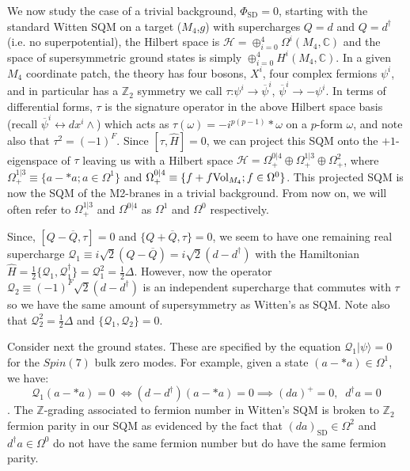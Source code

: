 \documentclass[12pt]{article}%
\numberwithin{equation}{section}
\renewcommand{\(}{\left(}
\renewcommand{\)}{\right)}
\renewcommand{\[}{\left[}
\renewcommand{\]}{\right]}
\begin{document}
 We now study the case of a trivial background, $\Phi_{\mathrm{SD}}=0$, starting with the standard Witten SQM on a target ($M_4$,$g$) with supercharges $Q=d$ and $Q=d^\dagger$ (i.e. no superpotential)\cite{10.4310/jdg/1214437492}, the Hilbert space is $\mathcal{H}=\oplus^{4}_{i=0}\Omega^i(M_4,\mathbb{C})$ and the space of supersymmetric ground states is simply $\oplus^{4}_{i=0}H^i(M_4,\mathbb{C})$. In a given $M_4$ coordinate patch, the theory has four bosons, $X^i$, four complex fermions $\psi^i$, and in particular has a $\mathbb{Z}_2$ symmetry we call $\tau$:\;$\psi^i\rightarrow \overline{\psi}^i$, $\overline{\psi}^i\rightarrow -\psi^i$. In terms of differential forms, $\tau$ is the signature operator in the above Hilbert space basis (recall $\overline{\psi}^i\leftrightarrow dx^i\wedge$) which acts as $\tau(\omega)=-i^{p(p-1)}*\omega$ on a $p$-form $\omega$, and note also that $\tau^2=(-1)^{F}$. Since $[\tau,\hat{H}]=0$, we can project this SQM onto the $+1$-eigenspace of $\tau$ leaving us with a Hilbert space $\mathcal{H}=\Omega^{0|4}_+\oplus \Omega^{1|3}_+\oplus \Omega^{2}_+$, where $\Omega_+^{1|3} \equiv \{ a-*a; a\in \Omega^1 \}$ and $\Omega^{0|4}_+ \equiv \{f+f\textnormal{Vol}_{M_4}; f\in \Omega^0\}$. This projected SQM is now the SQM of the M2-branes in a trivial background. From now on, we will often refer to $\Omega^{1|3}_+$ and $\Omega^{0|4}$ as $\Omega^1$ and $\Omega^0$ respectively.

Since, $[Q-\overline{Q},\tau]=0$ and $\{Q+\overline{Q},\tau\}=0$, we seem to have one remaining real supercharge $\mathcal{Q}_1 \equiv i\sqrt{2}(Q-\overline{Q})=i\sqrt{2}(d-d^{\dagger})$ with the Hamiltonian $\hat{H}=\frac{1}{2}\{ \mathcal{Q}_1,\mathcal{Q}_1^\dagger\}=\mathcal{Q}_1^2=\frac{1}{2}\Delta$. However, now the operator $\mathcal{Q}_2 \equiv (-1)^F\sqrt{2}(d-d^{\dagger})$ is an independent supercharge that commutes with $\tau$ so we have the same amount of supersymmetry as Witten's as SQM. Note also that $\mathcal{Q}_2^2=\frac{1}{2}\Delta$ and $\{\mathcal{Q}_1,\mathcal{Q}_2 \}=0$.

Consider next the ground states. These are specified by the equation $\mathcal{Q}_1 |\psi \rangle=0 $ for the $Spin(7)$ bulk zero modes. For example, given a state $(a-*a)\in\Omega^1$, we have:
\begin{equation}
\mathcal{Q}_1(a-*a)=0 \; \Leftrightarrow (d-d^\dagger)(a-*a)=0 \implies (da)^+=0, \; \; d^\dagger a=0
\end{equation}.
The $\mathbb{Z}$-grading associated to fermion number in Witten's SQM is broken to $\mathbb{Z}_2$ fermion parity in our SQM as evidenced by the fact that $(da)_{\mathrm{SD}}\in \Omega^2$ and $d^\dagger a\in \Omega^0$ do not have the same fermion number but do have the same fermion parity.
\end{document}
